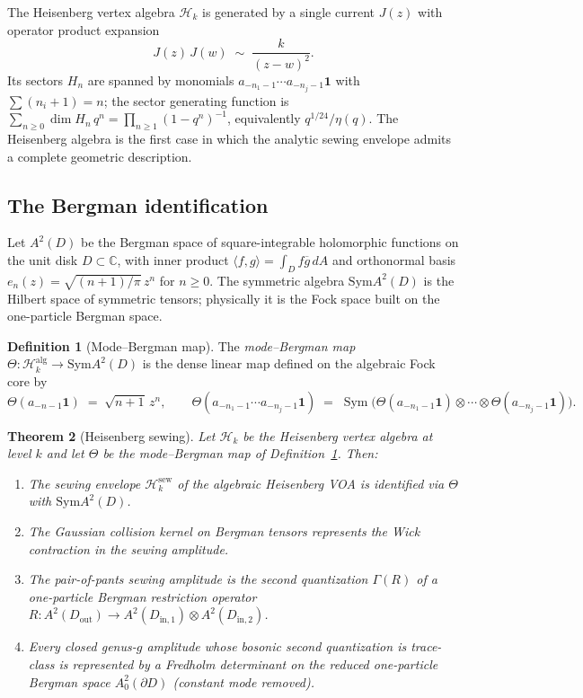\documentclass[11pt,reqno]{amsart}
\newtheorem{theorem}{Theorem}[section]
\theoremstyle{definition}
\newtheorem{definition}[theorem]{Definition}
\theoremstyle{remark}
\newcommand{\cH}{\mathcal{H}}
\newcommand{\Sym}{\mathrm{Sym}}
\numberwithin{equation}{section}
\begin{document}
The Heisenberg vertex algebra $\cH_k$ is generated by a single
current $J(z)$ with operator product expansion
\[
J(z)\, J(w) \;\sim\; \frac{k}{(z-w)^2}.
\]
Its sectors $H_n$ are spanned by monomials
$a_{-n_1-1}\cdots a_{-n_j-1}\mathbf{1}$ with $\sum (n_i + 1) = n$;
the sector generating function is
$\sum_{n \geq 0} \dim H_n\,q^n = \prod_{n \geq 1}(1 - q^n)^{-1}$,
equivalently $q^{1/24}/\eta(q)$. The
Heisenberg algebra is the first case in which the analytic sewing
envelope admits a complete geometric description.

\subsection{The Bergman identification}

Let $A^2(D)$ be the Bergman space of square-integrable holomorphic
functions on the unit disk $D \subset \mathbb{C}$, with inner
product $\langle f, g \rangle = \int_D f\overline{g}\,dA$ and
orthonormal basis $e_n(z) = \sqrt{(n+1)/\pi}\,z^n$ for
$n \geq 0$. The symmetric algebra $\Sym A^2(D)$ is the Hilbert
space of symmetric tensors; physically it is the Fock space
built on the one-particle Bergman space.

\begin{definition}[Mode--Bergman map]\label{def:theta-map}
The \emph{mode--Bergman map}
$\Theta \colon \cH_k^{\mathrm{alg}} \longrightarrow \Sym A^2(D)$
is the dense linear map defined on the algebraic Fock core by
\[
\Theta(a_{-n-1}\mathbf{1})
\;=\;
\sqrt{n+1}\, z^n,
\qquad
\Theta(a_{-n_1-1}\cdots a_{-n_j-1}\mathbf{1})
\;=\;
\operatorname{Sym}\bigl(\Theta(a_{-n_1-1}\mathbf{1})
\otimes \cdots \otimes \Theta(a_{-n_j-1}\mathbf{1})\bigr).
\]
\end{definition}

\begin{theorem}[Heisenberg sewing]\label{thm:heisenberg-sewing}
Let $\cH_k$ be the Heisenberg vertex algebra at level $k$ and let
$\Theta$ be the mode--Bergman map of
Definition~\ref{def:theta-map}. Then:
\begin{enumerate}[label=\textup{(\roman*)}]
\item The sewing envelope $\cH_k^{\mathrm{sew}}$ of the algebraic
Heisenberg VOA is identified via $\Theta$ with $\Sym A^2(D)$.
\item The Gaussian collision kernel on Bergman tensors represents
the Wick contraction in the sewing amplitude.
\item The pair-of-pants sewing amplitude is the second
quantization $\Gamma(R)$ of a one-particle Bergman restriction
operator $R \colon A^2(D_{\mathrm{out}}) \to
A^2(D_{\mathrm{in},1}) \otimes A^2(D_{\mathrm{in},2})$.
\item Every closed genus-$g$ amplitude whose bosonic second
quantization is trace-class is represented by a Fredholm determinant
on the reduced one-particle Bergman space
$A^2_0(\partial D)$ (constant mode removed).
\end{enumerate}
\end{theorem}
\end{document}
